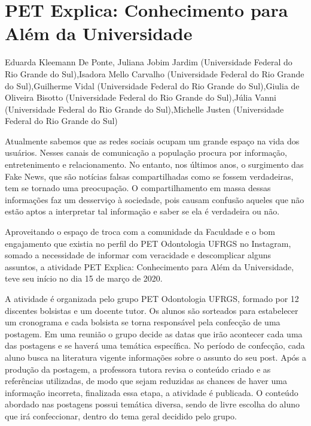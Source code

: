 

\section{PET Explica: Conhecimento para Além da Universidade}

Eduarda Kleemann De Ponte, Juliana Jobim Jardim (Universidade Federal do Rio Grande do Sul),Isadora Mello Carvalho (Universidade Federal do Rio Grande do Sul),Guilherme Vidal (Universidade Federal do Rio Grande do Sul),Giulia de Oliveira Bisotto (Universidade Federal do Rio Grande do Sul),Júlia Vanni (Universidade Federal do Rio Grande do Sul),Michelle Justen (Universidade Federal do Rio Grande do Sul)

Atualmente sabemos que as redes sociais ocupam um grande espaço na vida dos usuários. Nesses canais de comunicação a população procura por informação, entretenimento e relacionamento. No entanto, nos últimos anos, o surgimento das Fake News, que são notícias falsas compartilhadas como se fossem verdadeiras, tem se tornado uma preocupação. O compartilhamento em massa dessas informações faz um desserviço à sociedade, pois causam confusão aqueles que não estão aptos a interpretar tal informação e saber se ela é verdadeira ou não.

Aproveitando o espaço de troca com a comunidade da Faculdade e o bom engajamento que existia no perfil do PET Odontologia UFRGS no Instagram, somado a necessidade de informar com veracidade e descomplicar alguns assuntos, a atividade PET Explica: Conhecimento para Além da Universidade, teve seu início no dia 15 de março de 2020.

A atividade é organizada pelo grupo PET Odontologia UFRGS, formado por 12 discentes bolsistas e um docente tutor. Os alunos são sorteados para estabelecer um cronograma e cada bolsista se torna responsável pela confecção de uma postagem. Em uma reunião o grupo decide as datas que irão acontecer cada uma das postagens e se haverá uma temática específica. No período de confecção, cada aluno busca na literatura vigente informações sobre o assunto do seu post. Após a produção da postagem, a professora tutora revisa o conteúdo criado e as referências utilizadas, de modo que sejam reduzidas as chances de haver uma informação incorreta, finalizada essa etapa, a atividade é publicada. O conteúdo abordado nas postagens possui temática diversa, sendo de livre escolha do aluno que irá confeccionar, dentro do tema geral decidido pelo grupo.

